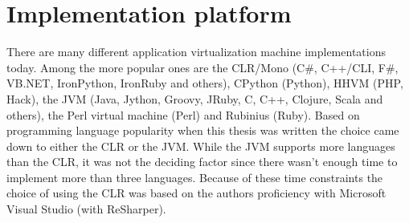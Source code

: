 \section{Implementation platform}
There are many different application virtualization machine implementations today. Among the more popular ones are the CLR/Mono (C\#, C++/CLI, F\#, VB.NET, IronPython, IronRuby and others), CPython (Python), HHVM (PHP, Hack), the JVM (Java, Jython, Groovy, JRuby, C, C++, Clojure, Scala and others), the Perl virtual machine (Perl) and Rubinius (Ruby). Based on programming language popularity when this thesis was written \cite{Tiobe} the choice came down to either the CLR or the JVM. While the JVM supports more languages than the CLR, it was not the deciding factor since there wasn't enough time to implement more than three languages. Because of these time constraints the choice of using the CLR was based on the authors proficiency with Microsoft Visual Studio (with ReSharper). 